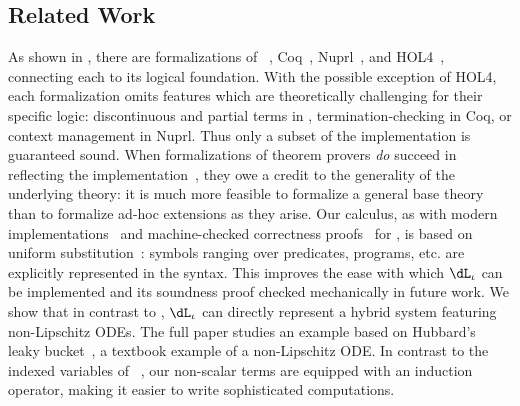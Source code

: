 \documentclass[12pt]{cmuthesis}
\theoremstyle{definition}
\theoremstyle{remark}
\newcommand{\rref}[2][]{\prettyref{#2}}
\newcommand{\dLi}{\ensuremath{\dL_\iota}\xspace}
\begin{document}
\subsection{Related Work}
As shown in \rref{fig:prover-formalizations}, there are formalizations of \KeYmaeraX~\cite{DBLP:conf/pldi/BohrerTMMP18}, Coq~\cite{DBLP:journals/jfrea/Barras10}, Nuprl~\cite{DBLP:conf/itp/AnandR14}, and HOL4~\cite{DBLP:journals/jar/KumarAMO16}, connecting each to its logical foundation.
With the possible exception of HOL4, each formalization omits features which are theoretically challenging for their specific logic: discontinuous and partial terms in \KeYmaeraX, termination-checking in Coq, or context management in Nuprl.
Thus only a subset of the implementation is guaranteed sound.
When formalizations of theorem provers \emph{do} succeed in reflecting the implementation~\cite{DBLP:journals/jar/KumarAMO16}, they owe a credit to the generality of the underlying theory: it is much more feasible to formalize a general base theory than to formalize ad-hoc extensions as they arise.
Our calculus, as with modern implementations~\cite{DBLP:conf/cade/FultonMQVP15} and machine-checked correctness proofs~\cite{DBLP:conf/cpp/BohrerRVVP17} for \dL, is based on uniform substitution~\cite[\S35,\S40]{Church:1956}: symbols ranging over predicates, programs, etc. are explicitly represented in the syntax.
This improves the ease with which \dLi can be implemented and its soundness proof checked mechanically in future work.
We show that in contrast to \dL, \dLi can directly represent a hybrid system featuring non-Lipschitz ODEs.
The full paper studies an example based on Hubbard's leaky bucket~\cite[\S4.2]{Hubbard}, a textbook example of a non-Lipschitz ODE.
In contrast to the indexed variables of \QdL~\cite{DBLP:journals/lmcs/Platzer12b}, our non-scalar terms are equipped with an induction operator, making it easier to write sophisticated computations.
%
\newcommand{\circsize}{0.3in}
\end{document}
